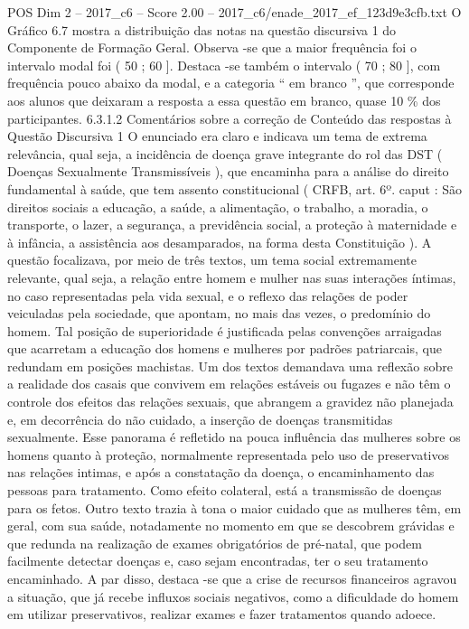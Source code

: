 \begin{textsample}{POS Dim 2 – 2017\_c6 – Score 2.00 – 2017\_c6/enade\_2017\_ef\_123d9e3cfb.txt}
O Gráfico 6.7 mostra a distribuição das notas na questão discursiva 1 do Componente de Formação Geral.
Observa -se que a maior frequência foi o intervalo modal foi ( 50 ; 60 ].
Destaca -se também o intervalo ( 70 ; 80 ], com frequência pouco abaixo da modal, e a categoria “ em branco ”, que corresponde aos alunos que deixaram a resposta a essa questão em branco, quase 10 \% dos participantes. 6.3.1.2 Comentários sobre a correção de Conteúdo das respostas à Questão Discursiva 1 O enunciado era claro e indicava um tema de extrema relevância, qual seja, a incidência de doença grave integrante do rol das DST ( Doenças Sexualmente Transmissíveis ), que encaminha para a análise do direito fundamental à saúde, que tem assento constitucional ( CRFB, art. 6º. caput : São direitos sociais a educação, a saúde, a alimentação, o trabalho, a moradia, o transporte, o lazer, a segurança, a previdência social, a proteção à maternidade e à infância, a assistência aos desamparados, na forma desta Constituição ).
A questão focalizava, por meio de três textos, um tema social extremamente relevante, qual seja, a relação entre homem e mulher nas suas interações íntimas, no caso representadas pela vida sexual, e o reflexo das relações de poder veiculadas pela sociedade, que apontam, no mais das vezes, o predomínio do homem.
Tal posição de superioridade é justificada pelas convenções arraigadas que acarretam a educação dos homens e mulheres por padrões patriarcais, que redundam em posições machistas.
Um dos textos demandava uma reflexão sobre a realidade dos casais que convivem em relações estáveis ou fugazes e não têm o controle dos efeitos das relações sexuais, que abrangem a gravidez não planejada e, em decorrência do não cuidado, a inserção de doenças transmitidas sexualmente.
Esse panorama é refletido na pouca influência das mulheres sobre os homens quanto à proteção, normalmente representada pelo uso de preservativos nas relações intimas, e após a constatação da doença, o encaminhamento das pessoas para tratamento.
Como efeito colateral, está a transmissão de doenças para os fetos.
Outro texto trazia à tona o maior cuidado que as mulheres têm, em geral, com sua saúde, notadamente no momento em que se descobrem grávidas e que redunda na realização de exames obrigatórios de pré-natal, que podem facilmente detectar doenças e, caso sejam encontradas, ter o seu tratamento encaminhado.
A par disso, destaca -se que a crise de recursos financeiros agravou a situação, que já recebe influxos sociais negativos, como a dificuldade do homem em utilizar preservativos, realizar exames e fazer tratamentos quando adoece.

\end{textsample}
